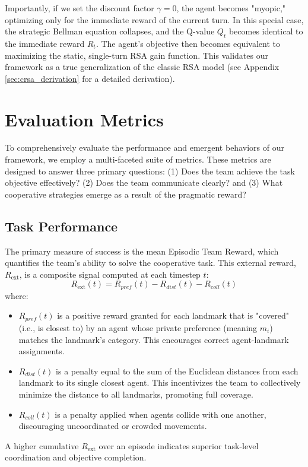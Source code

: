 \documentclass[12pt, a4paper]{report}
\newcommand{\Rext}{R_{\text{ext}}}
\begin{document}
Importantly, if we set the discount factor $\gamma=0$, the agent becomes "myopic," optimizing only for the immediate reward of the current turn. In this special case, the strategic Bellman equation collapses, and the Q-value $Q_t$ becomes identical to the immediate reward $R_t$. The agent's objective then becomes equivalent to maximizing the static, single-turn RSA gain function. This validates our framework as a true generalization of the classic RSA model (see Appendix \ref{sec:crsa_derivation} for a detailed derivation).

\section{Evaluation Metrics}
To comprehensively evaluate the performance and emergent behaviors of our framework, we employ a multi-faceted suite of metrics. These metrics are designed to answer three primary questions: (1) Does the team achieve the task objective effectively? (2) Does the team communicate clearly? and (3) What cooperative strategies emerge as a result of the pragmatic reward?

\subsection{Task Performance}
The primary measure of success is the mean Episodic Team Reward, which quantifies the team's ability to solve the cooperative task. This external reward, $\Rext$, is a composite signal computed at each timestep $t$:
$$ \Rext(t) = R_{pref}(t) - R_{dist}(t) - R_{coll}(t) $$
where:
\begin{itemize}
	\item $R_{pref}(t)$ is a positive reward granted for each landmark that is "covered" (i.e., is closest to) by an agent whose private preference (meaning $m_i$) matches the landmark's category. This encourages correct agent-landmark assignments.
	\item $R_{dist}(t)$ is a penalty equal to the sum of the Euclidean distances from each landmark to its single closest agent. This incentivizes the team to collectively minimize the distance to all landmarks, promoting full coverage.
	\item $R_{coll}(t)$ is a penalty applied when agents collide with one another, discouraging uncoordinated or crowded movements.
\end{itemize}
A higher cumulative $\Rext$ over an episode indicates superior task-level coordination and objective completion.
\end{document}
